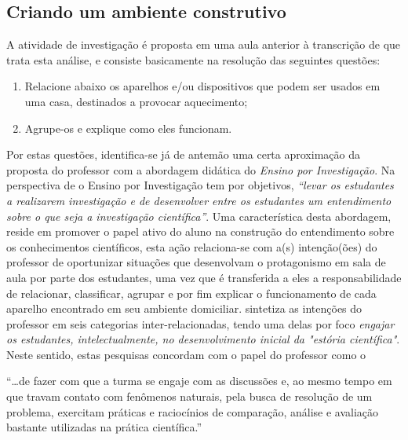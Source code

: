 \subsection{Criando um ambiente construtivo}
A atividade de investigação é proposta em uma aula anterior à transcrição de que trata esta análise, e consiste basicamente na resolução das seguintes questões:
\begin{enumerate}[label=\roman *)]
    \item Relacione abaixo os aparelhos e/ou dispositivos que podem ser usados em uma casa, destinados a provocar aquecimento;
    \item Agrupe-os e explique como eles funcionam.
\end{enumerate}
Por estas questões, identifica-se já de antemão uma certa aproximação da proposta do professor com a abordagem didática do \emph{Ensino por Investigação}. Na perspectiva de  o Ensino por Investigação tem por objetivos, \emph{``levar os estudantes a realizarem investigação e de desenvolver entre os estudantes um entendimento sobre o que seja a investigação científica''}. Uma característica desta abordagem, reside em promover o papel ativo do aluno na construção do entendimento sobre os conhecimentos científicos, esta ação relaciona-se com a(s) intenção(ões) do professor de oportunizar situações que desenvolvam o protagonismo em sala de aula por parte dos estudantes, uma vez que é transferida a eles a responsabilidade de relacionar, classificar, agrupar e por fim explicar o funcionamento de cada aparelho encontrado em seu ambiente domiciliar. \cite{MORTIMER:2002} sintetiza as intenções do professor em seis categorias inter-relacionadas, tendo uma delas por foco \emph{engajar os estudantes, intelectualmente, no desenvolvimento inicial da "estória científica"}. Neste sentido, estas pesquisas concordam com o papel do professor como o
\begin{citacao}
    ``\ldots de fazer com que a turma se engaje com as discussões e, ao mesmo tempo em que travam contato com fenômenos naturais, pela busca de resolução de um problema, exercitam práticas e raciocínios de comparação, análise e avaliação bastante utilizadas na prática científica.'' \cite[p. ~58]{SASSERON:2015}
\end{citacao}

